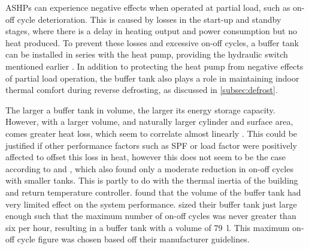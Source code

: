 \acp{ASHP} can experience negative effects when operated at partial load, such as on-off cycle deterioration. This is caused by losses in the start-up and standby stages, where there is a delay in heating output and power consumption but no heat produced. To prevent these losses and excessive on-off cycles, a buffer tank can be installed in series with the heat pump, providing the hydraulic switch mentioned earlier \cite{bagarella_cycling_2013}. In addition to protecting the heat pump from negative effects of partial load operation, the buffer tank also plays a role in maintaining indoor thermal comfort during reverse defrosting, as discussed in \cref{subsec:defrost}.

The larger a buffer tank in volume, the larger its energy storage capacity. However, with a larger volume, and naturally larger cylinder and surface area, comes greater heat loss, which seem to correlate almost linearly \cite{klein_numerical_2014}. This could be justified if other performance factors such as \ac{SPF} or load factor were positively affected to offset this loss in heat, however this does not seem to be the case according to \cite{roccatello_analysis_2022} and \cite{klein_numerical_2014}, which also found only a moderate reduction in on-off cycles with smaller tanks. This is partly to do with the thermal inertia of the building and return temperature controller. 
\citeauthor{klein_numerical_2014} found that the volume of the buffer tank had very limited effect on the system performance. \citeauthor{dongellini_influence_2021} \cite{dongellini_influence_2021} sized their buffer tank just large enough such that the maximum number of on-off cycles was never greater than six per hour,  resulting in a buffer tank with a volume of \SI{79}{\litre}.  This maximum on-off cycle figure was chosen based off their \HP manufacturer guidelines.%

